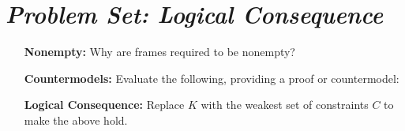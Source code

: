 \documentclass[a4paper, 11pt]{article} %
\begin{document}
\section*{\it Problem Set: Logical Consequence}

\begin{enumerate}[leftmargin=1.2in,itemsep=1pt]\small
	\item[\bf Nonempty:] Why are frames required to be nonempty?
	\item[\bf Countermodels:] Evaluate the following, providing a proof or countermodel:
    \begin{enumerate}[label=\arabic*.,resume]\small
    \end{enumerate}
	\item[\bf Logical Consequence:] Replace $K$ with the weakest set of constraints $C$ to make the above hold. 

\end{enumerate}
\end{document}
